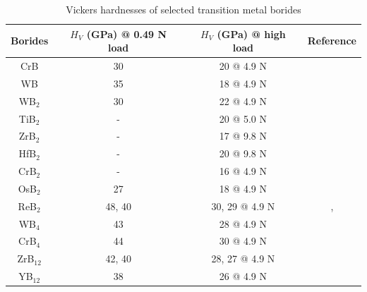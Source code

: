 	\setlength{\tabcolsep}{12pt} %
	\renewcommand{\arraystretch}{1.5} %
    \begin{table}[htb]
    \captionsetup{singlelinecheck = false, justification=justified}
    \caption[Vickers Hardnesses of selected transition metal borides]{Vickers hardnesses of selected transition metal borides}
    \label{tab:hardness_TM_borides}
    \begin{tabular*}{\textwidth}{c|c|c|c}
        Borides  & {$H_V$ (GPa) @ 0.49 N load} & $H_V$ (GPa) @ high load & Reference  \\ \hline
        CrB       &  30   & 20 @ 4.9 N   & ~\cite{CrB_han2015hardness} \\
        WB        &  35   & 18 @ 4.9 N   &
        ~\cite{WB_yeung2016superhard} \\
        WB$_2$    &  30   & 22 @ 4.9 N   &
        ~\cite{pangilinan2018superhard} \\
        TiB$_2$   &  -    & 20 @ 5.0 N   & ~\cite{TiB2_munro2000material} \\
        ZrB$_2$   &  -    & 17 @ 9.8 N   & ~\cite{ZrB2_HfB2_zapata2013mechanical} \\
        HfB$_2$   &  -    & 20 @ 9.8 N   & ~\cite{ZrB2_HfB2_zapata2013mechanical} \\
        CrB$_2$   &  -    & 16 @ 4.9 N   & ~\cite{CrB2_CrB4_wang2014crystal} \\
        OsB$_2$   &  27   & 18 @ 4.9 N   & ~\cite{OsB2_chung2008anisotropic} \\
        ReB$_2$   & 48, 40   & 30, 29 @ 4.9 N   & ~\cite{ReB2_chung2007synthesis},~\cite{lech2016superhard} \\
        WB$_4$    &  43   & 28 @ 4.9 N   & ~\cite{WB4_mohammadi2011tungsten} \\
        CrB$_4$   &  44   & 30 @ 4.9 N   & ~\cite{CrB2_CrB4_wang2014crystal} \\  
        ZrB$_{12}$&  42, 40   & 28, 27 @ 4.9 N   & ~\cite{YB12_akopov2019synthesis, ZrB12_ma2017ultrastrong} \\
        YB$_{12}$ &  38   & 26 @ 4.9 N   & ~\cite{YB12_akopov2019synthesis} \\
    \end{tabular*}
    \end{table}

